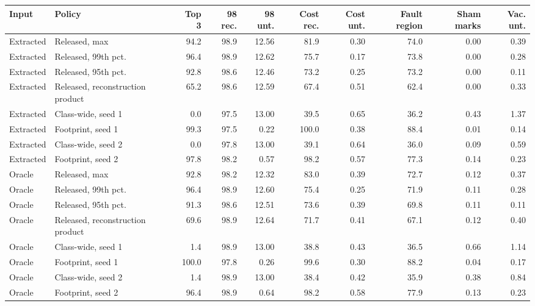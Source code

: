 \begin{tabular}{llrrrrrrrr}
\toprule
Input & Policy & Top 3 & 98 rec. & 98 unt. & Cost rec. & Cost unt. & Fault region & Sham marks & Vac. unt. \\
\midrule
Extracted & Released, max & 94.2 & 98.9 & 12.56 & 81.9 & 0.30 & 74.0 & 0.00 & 0.39 \\
Extracted & Released, 99th pct. & 96.4 & 98.9 & 12.62 & 75.7 & 0.17 & 73.8 & 0.00 & 0.28 \\
Extracted & Released, 95th pct. & 92.8 & 98.6 & 12.46 & 73.2 & 0.25 & 73.2 & 0.00 & 0.11 \\
Extracted & Released, reconstruction product & 65.2 & 98.6 & 12.59 & 67.4 & 0.51 & 62.4 & 0.00 & 0.33 \\
Extracted & Class-wide, seed 1 & 0.0 & 97.5 & 13.00 & 39.5 & 0.65 & 36.2 & 0.43 & 1.37 \\
Extracted & Footprint, seed 1 & 99.3 & 97.5 & 0.22 & 100.0 & 0.38 & 88.4 & 0.01 & 0.14 \\
Extracted & Class-wide, seed 2 & 0.0 & 97.8 & 13.00 & 39.1 & 0.64 & 36.0 & 0.09 & 0.59 \\
Extracted & Footprint, seed 2 & 97.8 & 98.2 & 0.57 & 98.2 & 0.57 & 77.3 & 0.14 & 0.23 \\
\midrule
Oracle & Released, max & 92.8 & 98.2 & 12.32 & 83.0 & 0.39 & 72.7 & 0.12 & 0.37 \\
Oracle & Released, 99th pct. & 96.4 & 98.9 & 12.60 & 75.4 & 0.25 & 71.9 & 0.11 & 0.28 \\
Oracle & Released, 95th pct. & 91.3 & 98.6 & 12.51 & 73.6 & 0.39 & 69.8 & 0.11 & 0.11 \\
Oracle & Released, reconstruction product & 69.6 & 98.9 & 12.64 & 71.7 & 0.41 & 67.1 & 0.12 & 0.40 \\
Oracle & Class-wide, seed 1 & 1.4 & 98.9 & 13.00 & 38.8 & 0.43 & 36.5 & 0.66 & 1.14 \\
Oracle & Footprint, seed 1 & 100.0 & 97.8 & 0.26 & 99.6 & 0.30 & 88.2 & 0.04 & 0.17 \\
Oracle & Class-wide, seed 2 & 1.4 & 98.9 & 13.00 & 38.4 & 0.42 & 35.9 & 0.38 & 0.84 \\
Oracle & Footprint, seed 2 & 96.4 & 98.9 & 0.64 & 98.2 & 0.58 & 77.9 & 0.13 & 0.23 \\
\bottomrule
\end{tabular}
